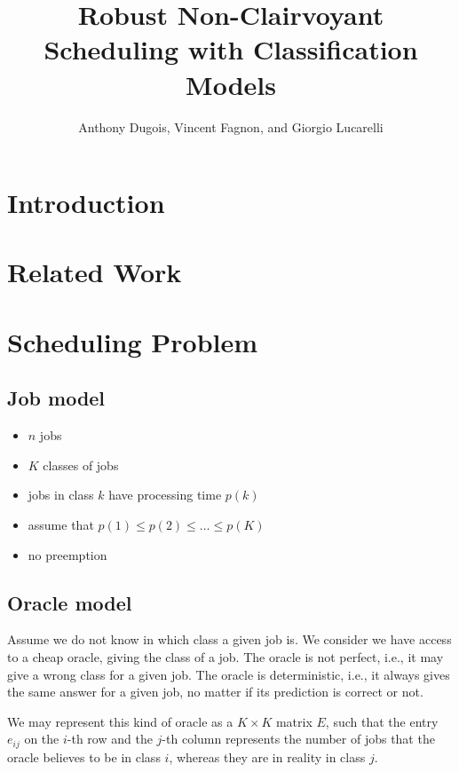 \documentclass{article}
\title{Robust Non-Clairvoyant Scheduling with Classification Models}
\author{Anthony Dugois, Vincent Fagnon, and Giorgio Lucarelli}
\date{}
\begin{document}
\maketitle

\section{Introduction}

\section{Related Work}

\section{Scheduling Problem}

\subsection{Job model}

\begin{itemize}
    \item \(n\) jobs
    \item \(K\) classes of jobs
    \item jobs in class \(k\) have processing time \(p(k)\)
    \item assume that \(p(1)\le p(2)\le\dots\le p(K)\)
    \item no preemption
\end{itemize}

\subsection{Oracle model}

Assume we do not know in which class a given job is. We consider we have access to a cheap oracle, giving the class of a
job. The oracle is not perfect, i.e., it may give a wrong class for a given job. The oracle is deterministic, i.e., it
always gives the same answer for a given job, no matter if its prediction is correct or not.

We may represent this kind of oracle as a \(K\times K\) matrix \(E\), such that the entry \(e_{ij}\) on the \(i\)-th row
and the \(j\)-th column represents the number of jobs that the oracle believes to be in class \(i\), whereas they are in
reality in class \(j\).
\end{document}
